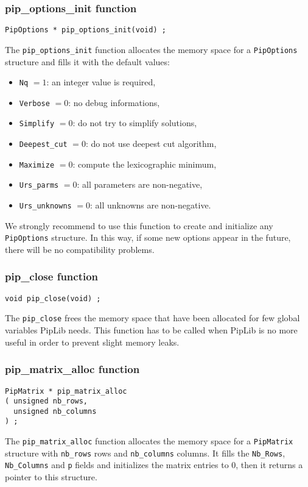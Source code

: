 \documentclass[12pt,a4paper,dvips]{article}
\begin{document}
\subsubsection{pip\_options\_init function}\label{optinit}
\begin{verbatim}
PipOptions * pip_options_init(void) ;
\end{verbatim}
The {\tt pip\_options\_init} function allocates the memory space for a
{\tt PipOptions} structure and fills it with the default values:
\begin{itemize}
\item {\tt Nq} $= 1$: an integer value is required,
\item {\tt Verbose} $= 0$: no debug informations,
\item {\tt Simplify} $= 0$: do not try to simplify solutions,
\item {\tt Deepest\_cut} $= 0$: do not use deepest cut algorithm,
\item {\tt Maximize} $= 0$: compute the lexicographic minimum,
\item \verb+Urs_parms+ $= 0$: all parameters are non-negative,
\item \verb+Urs_unknowns+ $= 0$: all unknowns are non-negative.
\end{itemize}
We strongly recommend to use this function to create and initialize any
{\tt PipOptions} structure. In this way, if some new options appear in
the future, there will be no compatibility problems.

\subsubsection{pip\_close function}
\begin{verbatim}
void pip_close(void) ;
\end{verbatim}
The {\tt pip\_close} frees the memory space that have been allocated for
few global variables PipLib needs. This function has to be called when
PipLib is no more useful in order to prevent slight memory leaks.

\subsubsection{pip\_matrix\_alloc function}
\begin{verbatim}
PipMatrix * pip_matrix_alloc
( unsigned nb_rows,
  unsigned nb_columns
) ;
\end{verbatim}
The {\tt pip\_matrix\_alloc} function allocates the memory space
for a {\tt PipMatrix} structure with {\tt nb\_rows} rows and {\tt nb\_columns}
columns. It fills the {\tt Nb\_Rows}, {\tt Nb\_Columns} and {\tt p} fields
and initializes the matrix entries to 0, then it returns a pointer to this
structure.
\end{document}
